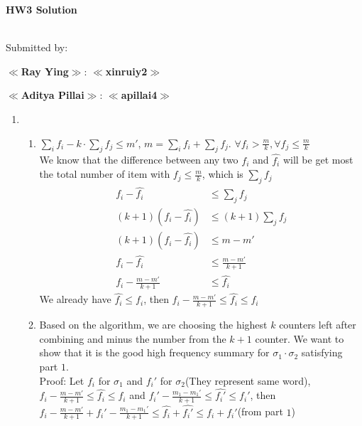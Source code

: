 \documentclass[11pt]{article}%
\begin{document}
\noindent\textbf{\LARGE HW{3} Solution}\\
\noindent{\textbf{\Course: \CourseName, \Semester}}
\hfill{}%
\\[-0.12cm]
%
\Hr%
\smallskip%

\noindent%
Submitted by:
\begin{compactitem}
    \item \textbf{$\ll$Ray Ying$\gg$}:
    \textbf{$\ll$xinruiy2$\gg$}
    \item \textbf{$\ll$Aditya Pillai$\gg$}:
    \textbf{$\ll$apillai4$\gg$}
\end{compactitem}
\Hr
\medskip
\SaveIndent%

\begin{questions}[1]
    \item \begin{enumerate}
    \item   
    \begin{enumerate}
        \item  $\sum_i f_i - k \cdot \sum_j f_j \leq m'$, $m = \sum_i f_i + \sum_j f_j$.  $\forall {f_i > \frac{m}{k}}, \forall {f_j \leq \frac{m}{k}}$\\
        We know that the difference between any two $f_i$ and $\hat{f_i}$ will be get most the total number of item with $f_j \leq \frac{m}{k}$, which is $\sum_j f_j$ \\
        \begin{align*}
            f_i - \hat {f_i}
            &\leq \sum_j f_j\\
            (k + 1) (f_i - \hat {f_i})
            &\leq (k+1) \sum_j f_j \\
            (k + 1) (f_i - \hat {f_i}) &\leq m - m' \\
            f_i - \hat {f_i} &\leq \frac{m - m'}{k+1} \\
            f_i - \frac{m - m'}{k+1}  &\leq \hat {f_i}
        \end{align*}    
        We already have $\hat{f_i} \leq f_i$, then $f_i - \frac{m - m'}{k+1} \leq \hat {f_i} \leq f_i$
        \item  Based on the algorithm, we are choosing the highest $k$ counters left after combining and minus the number from the $k+1$ counter. We want to show that it is the good high frequency summary for $\sigma_1 \cdot \sigma_2$ satisfying part $1$.\\
        
        Proof: Let $f_i$ for $\sigma_1$ and $f_i'$ for $\sigma_2$(They represent same word), $f_i - \frac{m - m'}{k+1} \leq \hat {f_i} \leq f_i$ and $f_i' - \frac{m_1 - m_1'}{k+1} \leq \hat {f_i'} \leq f_i'$, then $f_i - \frac{m - m'}{k+1} + f_i' - \frac{m_1 - m_1'}{k+1} \leq \hat {f_i} + \hat {f_i'} \leq f_i + f_i'$(from part $1$)\\
        

\end{enumerate}
\end{enumerate}
\end{questions}
\end{document}
